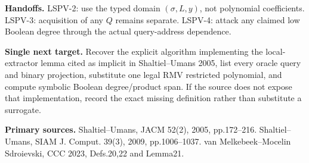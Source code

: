 \documentclass[11pt]{article}
\begin{document}
\textbf{Handoffs.} LSPV-2: use the typed domain $(\sigma,L,y)$, not polynomial coefficients. LSPV-3: acquisition of any $Q$ remains separate. LSPV-4: attack any claimed low Boolean degree through the actual query-address dependence.

\textbf{Single next target.} Recover the explicit algorithm implementing the local-extractor lemma cited as implicit in Shaltiel--Umans 2005, list every oracle query and binary projection, substitute one legal RMV restricted polynomial, and compute symbolic Boolean degree/product span. If the source does not expose that implementation, record the exact missing definition rather than substitute a surrogate.

\textbf{Primary sources.} Shaltiel--Umans, JACM 52(2), 2005, pp.172--216. Shaltiel--Umans, SIAM J. Comput. 39(3), 2009, pp.1006--1037. van Melkebeek--Mocelin Sdroievski, CCC 2023, Defs.20,22 and Lemma21.
\end{document}
